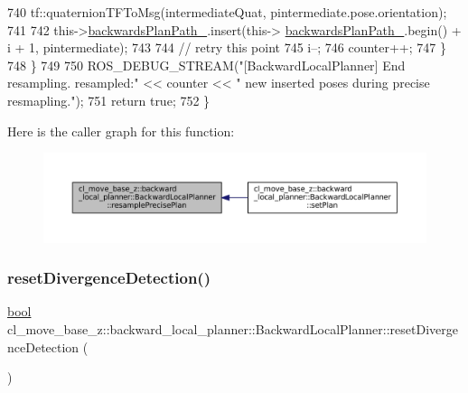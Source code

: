 \begin{DoxyCode}
740                     tf::quaternionTFToMsg(intermediateQuat, pintermediate.pose.orientation);
741 
742                     this->\hyperlink{classcl__move__base__z_1_1backward__local__planner_1_1BackwardLocalPlanner_ad9cde5c85f782cab2ddb4030e3c3f2cf}{backwardsPlanPath\_}.insert(this->
      \hyperlink{classcl__move__base__z_1_1backward__local__planner_1_1BackwardLocalPlanner_ad9cde5c85f782cab2ddb4030e3c3f2cf}{backwardsPlanPath\_}.begin() + i + 1, pintermediate);
743 
744                     \textcolor{comment}{// retry this point}
745                     i--;
746                     counter++;
747                 \}
748             \}
749 
750             ROS\_DEBUG\_STREAM(\textcolor{stringliteral}{"[BackwardLocalPlanner] End resampling. resampled:"} << counter << \textcolor{stringliteral}{" new
       inserted poses during precise resmapling."});
751             \textcolor{keywordflow}{return} \textcolor{keyword}{true};
752         \}
\end{DoxyCode}
Here is the caller graph for this function\+:
\nopagebreak
\begin{figure}[H]
\begin{center}
\leavevmode
\includegraphics[width=350pt]{classcl__move__base__z_1_1backward__local__planner_1_1BackwardLocalPlanner_a100fe8bdaaf89b0fa54ecf2aef0966ed_icgraph}
\end{center}
\end{figure}
\mbox{\label{classcl__move__base__z_1_1backward__local__planner_1_1BackwardLocalPlanner_a35832ebefc43e5977e1222389244c8d3}} 
\subsubsection{\texorpdfstring{reset\+Divergence\+Detection()}{resetDivergenceDetection()}}
{\footnotesize\ttfamily \hyperlink{classbool}{bool} cl\+\_\+move\+\_\+base\+\_\+z\+::backward\+\_\+local\+\_\+planner\+::\+Backward\+Local\+Planner\+::reset\+Divergence\+Detection (\begin{DoxyParamCaption}{ }\end{DoxyParamCaption})\hspace{0.3cm}{\ttfamily [private]}}



